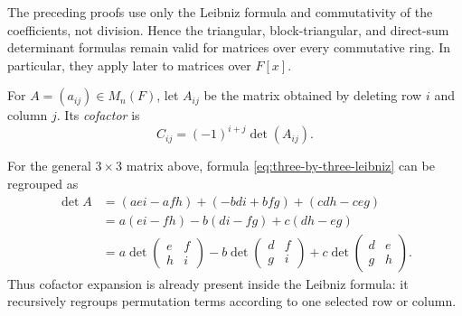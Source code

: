 \begin{remark}
The preceding proofs use only the Leibniz formula and commutativity of the
coefficients, not division.  Hence the triangular, block-triangular, and
direct-sum determinant formulas remain valid for matrices over every
commutative ring.  In particular, they apply later to matrices over \(F[x]\).
\end{remark}

\begin{definition}
For \(A=(a_{ij})\in M_n(F)\), let \(A_{ij}\) be the matrix obtained by
deleting row \(i\) and column \(j\). Its \emph{cofactor} is
\[
C_{ij}=(-1)^{i+j}\det(A_{ij}).
\]
\end{definition}

For the general \(3\times3\) matrix above, formula
\eqref{eq:three-by-three-leibniz} can be regrouped as
\[
\begin{aligned}
\det A
&=(aei-afh)+(-bdi+bfg)+(cdh-ceg)\\
&=a(ei-fh)-b(di-fg)+c(dh-eg)\\
&=a\det\begin{pmatrix}e&f\\h&i\end{pmatrix}
-b\det\begin{pmatrix}d&f\\g&i\end{pmatrix}
+c\det\begin{pmatrix}d&e\\g&h\end{pmatrix}.
\end{aligned}
\]
Thus cofactor expansion is already present inside the Leibniz formula: it
recursively regroups permutation terms according to one selected row or
column.

